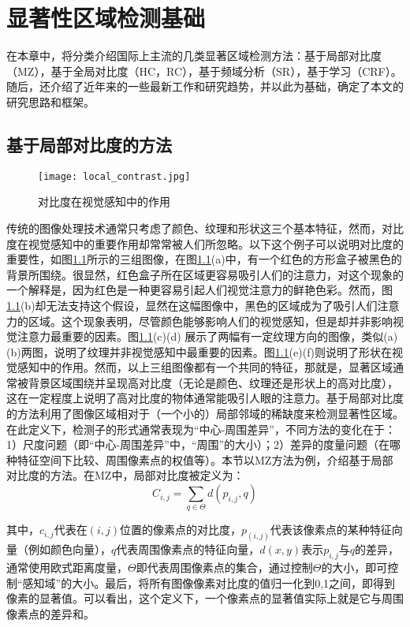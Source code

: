 
\chapter{显著性区域检测基础}
在本章中，将分类介绍国际上主流的几类显著区域检测方法：基于局部对比度（MZ\cite{ma2003contrast}），基于全局对比度（HC，RC\cite{cheng2011global}），基于频域分析（SR\cite{hou2007saliency}），基于学习（CRF\cite{maisaliency}）。随后，还介绍了近年来的一些最新工作和研究趋势，并以此为基础，确定了本文的研究思路和框架。

\section{基于局部对比度的方法}
\begin{figure}[h]
\centering
\texttt{[image: local\_contrast.jpg]}
\caption{对比度在视觉感知中的作用}\label{fig:local_contrast}
\end{figure}

传统的图像处理技术通常只考虑了颜色、纹理和形状这三个基本特征，然而，对比度在视觉感知中的重要作用却常常被人们所忽略。以下这个例子可以说明对比度的重要性\citep{ma2003contrast}，如图\ref{fig:local_contrast}所示的三组图像，在图\ref{fig:local_contrast}(a)中，有一个红色的方形盒子被黑色的背景所围绕。很显然，红色盒子所在区域更容易吸引人们的注意力，对这个现象的一个解释是，因为红色是一种更容易引起人们视觉注意力的鲜艳色彩。然而，图\ref{fig:local_contrast}(b)却无法支持这个假设，显然在这幅图像中，黑色的区域成为了吸引人们注意力的区域。这个现象表明，尽管颜色能够影响人们的视觉感知，但是却并非影响视觉注意力最重要的因素。图\ref{fig:local_contrast}(c)(d) 展示了两幅有一定纹理方向的图像，类似(a)(b)两图，说明了纹理并非视觉感知中最重要的因素。图\ref{fig:local_contrast}(e)(f)则说明了形状在视觉感知中的作用。然而，以上三组图像都有一个共同的特征，那就是，显著区域通常被背景区域围绕并呈现高对比度（无论是颜色、纹理还是形状上的高对比度），这在一定程度上说明了高对比度的物体通常能吸引人眼的注意力。基于局部对比度的方法利用了图像区域相对于（一个小的）局部邻域的稀缺度来检测显著性区域。在此定义下，检测子的形式通常表现为“中心-周围差异”，不同方法的变化在于：1）尺度问题（即“中心-周围差异”中，“周围”的大小）；2）差异的度量问题（在哪种特征空间下比较、周围像素点的权值等）。本节以MZ\cite{ma2003contrast}方法为例，介绍基于局部对比度的方法。在MZ中，局部对比度被定义为：
\begin{equation}
C_{i,j} = \sum_{q \in \Theta}d(p_{i,j},q) \label{eq:local}
\end{equation}

其中，$c_{i,j}$代表在$(i,j)$位置的像素点的对比度，$p_(i,j)$代表该像素点的某种特征向量（例如颜色向量），$q$代表周围像素点的特征向量，$d(x,y)$表示$p_{i,j}$与$q$的差异，通常使用欧式距离度量，$\Theta$即代表周围像素点的集合，通过控制$\Theta$的大小，即可控制“感知域”的大小。最后，将所有图像像素对比度的值归一化到0,1之间，即得到像素的显著值。可以看出，这个定义下，一个像素点的显著值实际上就是它与周围像素点的差异和。

